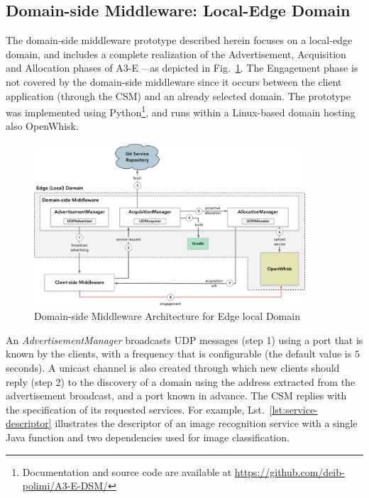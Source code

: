 \subsection{Domain-side Middleware: Local-Edge Domain}


The domain-side middleware prototype described herein focuses on a local-edge domain, and includes a complete realization of the Advertisement, Acquisition and Allocation phases of A3-E -- as depicted in Fig.~\ref{fig:local-edge-domain-prototype}. The Engagement phase is not covered by the domain-side middleware since it occurs between the client application (through the CSM) and an already selected domain. The prototype was implemented using Python\footnote{Documentation and source code are available at \url{https://github.com/deib-polimi/A3-E-DSM/}}, and runs within a Linux-based domain hosting also OpenWhisk. 


\begin{figure}[tbp]
	\includegraphics[width=0.9\textwidth]{figs/a3e-domain-prototype}
	\caption{Domain-side Middleware Architecture for Edge local Domain}
	\label{fig:local-edge-domain-prototype}
\end{figure}

An \textit{AdvertisementManager} broadcasts UDP messages (step 1) using a port that is known by the clients, with a frequency that is configurable (the default value is $5$ seconds). A unicast channel is also created through which new clients should reply (step 2) to the discovery of a domain using the address extracted from the advertisement broadcast, and a port known in advance. The CSM replies with the specification of its requested services. For example, Lst.~\ref{lst:service-descriptor} illustrates the descriptor of an image recognition service with a single Java function and two dependencies used for image classification.

